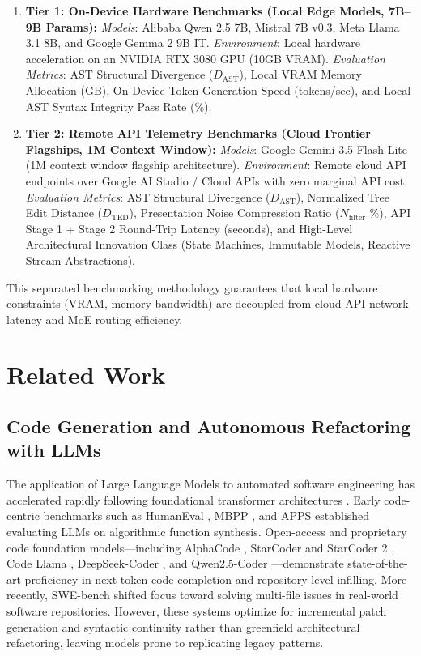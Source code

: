 \documentclass[10pt,journal,compsoc]{IEEEtran}
\begin{document}
\begin{enumerate}
    \item \textbf{Tier 1: On-Device Hardware Benchmarks (Local Edge Models, 7B--9B Params):}
    \textit{Models}: Alibaba Qwen 2.5 7B, Mistral 7B v0.3, Meta Llama 3.1 8B, and Google Gemma 2 9B IT.
    \textit{Environment}: Local hardware acceleration on an NVIDIA RTX 3080 GPU (10GB VRAM).
    \textit{Evaluation Metrics}: AST Structural Divergence ($D_{\text{AST}}$), Local VRAM Memory Allocation (GB), On-Device Token Generation Speed (tokens/sec), and Local AST Syntax Integrity Pass Rate (\%).
    
    \item \textbf{Tier 2: Remote API Telemetry Benchmarks (Cloud Frontier Flagships, 1M Context Window):}
    \textit{Models}: Google Gemini 3.5 Flash Lite (1M context window flagship architecture).
    \textit{Environment}: Remote cloud API endpoints over Google AI Studio / Cloud APIs with zero marginal API cost.
    \textit{Evaluation Metrics}: AST Structural Divergence ($D_{\text{AST}}$), Normalized Tree Edit Distance ($D_{\text{TED}}$), Presentation Noise Compression Ratio ($N_{\text{filter}}$ \%), API Stage 1 + Stage 2 Round-Trip Latency (seconds), and High-Level Architectural Innovation Class (State Machines, Immutable Models, Reactive Stream Abstractions).
\end{enumerate}

This separated benchmarking methodology guarantees that local hardware constraints (VRAM, memory bandwidth) are decoupled from cloud API network latency and MoE routing efficiency.

\section{Related Work}

\subsection{Code Generation and Autonomous Refactoring with LLMs}
The application of Large Language Models to automated software engineering has accelerated rapidly following foundational transformer architectures \cite{vaswani2017attention, brown2020language}. Early code-centric benchmarks such as HumanEval \cite{chen2021evaluating}, MBPP \cite{austin2021program}, and APPS \cite{hendrycks2021measuring} established evaluating LLMs on algorithmic function synthesis. Open-access and proprietary code foundation models---including AlphaCode \cite{li2022competition}, StarCoder and StarCoder 2 \cite{li2023starcoder, lozhkov2024starcoder2}, Code Llama \cite{roziere2023code}, DeepSeek-Coder \cite{guo2024deepseek}, and Qwen2.5-Coder \cite{hui2024qwen25coder}---demonstrate state-of-the-art proficiency in next-token code completion and repository-level infilling. More recently, SWE-bench \cite{jimenez2024swebench} shifted focus toward solving multi-file issues in real-world software repositories. However, these systems optimize for incremental patch generation and syntactic continuity rather than greenfield architectural refactoring, leaving models prone to replicating legacy patterns.
\end{document}
